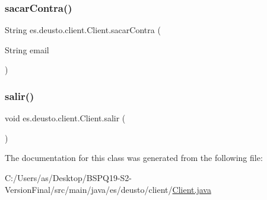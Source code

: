 \mbox{\label{classes_1_1deusto_1_1client_1_1_client_a6ce290f27e4f39f9493799cbc6112cc5}} 
\subsubsection{\texorpdfstring{sacarContra()}{sacarContra()}}
{\footnotesize\ttfamily String es.\+deusto.\+client.\+Client.\+sacar\+Contra (\begin{DoxyParamCaption}\item[{String}]{email }\end{DoxyParamCaption})}

\mbox{\label{classes_1_1deusto_1_1client_1_1_client_ac6d57dc4fbeeef9d6d60637c4e1bd1c6}} 
\subsubsection{\texorpdfstring{salir()}{salir()}}
{\footnotesize\ttfamily void es.\+deusto.\+client.\+Client.\+salir (\begin{DoxyParamCaption}{ }\end{DoxyParamCaption})}



The documentation for this class was generated from the following file\+:\begin{DoxyCompactItemize}
\item 
C\+:/\+Users/as/\+Desktop/\+B\+S\+P\+Q19-\/\+S2-\/\+Version\+Final/src/main/java/es/deusto/client/\mbox{\hyperlink{_client_8java}{Client.\+java}}\end{DoxyCompactItemize}
